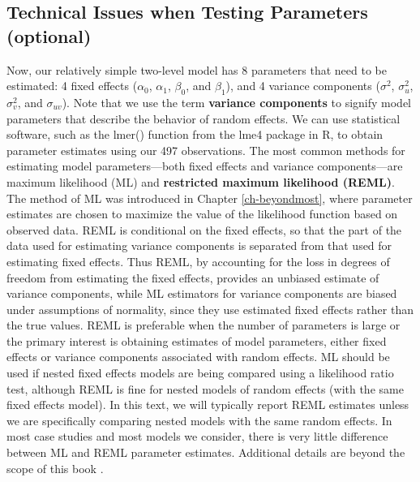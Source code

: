\documentclass[
]{krantz}
\begin{document}
\hypertarget{multileveltechnical}{%
\subsection{Technical Issues when Testing Parameters (optional)}\label{multileveltechnical}}

Now, our relatively simple two-level model has 8 parameters that need to be estimated: 4 fixed effects (\(\alpha_{0}\), \(\alpha_{1}\), \(\beta_{0}\), and \(\beta_{1}\)), and 4 variance components (\(\sigma^{2}\), \(\sigma_{u}^{2}\), \(\sigma_{v}^{2}\), and \(\sigma_{uv}\)). Note that we use the term \textbf{variance components}  to signify model parameters that describe the behavior of random effects. We can use statistical software, such as the lmer() function from the lme4 package in R, to obtain parameter estimates using our 497 observations. The most common methods for estimating model parameters---both fixed effects and variance components---are maximum likelihood (ML) and \textbf{restricted maximum likelihood (REML)}.  The method of ML was introduced in Chapter \ref{ch-beyondmost}, where parameter estimates are chosen to maximize the value of the likelihood function based on observed data. REML is conditional on the fixed effects, so that the part of the data used for estimating variance components is separated from that used for estimating fixed effects. Thus REML, by accounting for the loss in degrees of freedom from estimating the fixed effects, provides an unbiased estimate of variance components, while ML estimators for variance components are biased under assumptions of normality, since they use estimated fixed effects rather than the true values. REML is preferable when the number of parameters is large or the primary interest is obtaining estimates of model parameters, either fixed effects or variance components associated with random effects. ML should be used if nested fixed effects models are being compared using a likelihood ratio test, although REML is fine for nested models of random effects (with the same fixed effects model). In this text, we will typically report REML estimates unless we are specifically comparing nested models with the same random effects. In most case studies and most models we consider, there is very little difference between ML and REML parameter estimates. Additional details are beyond the scope of this book \citep{Singer2003}.
\end{document}
